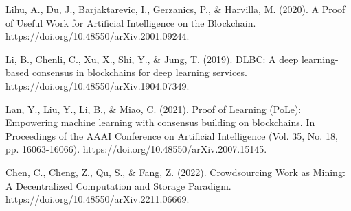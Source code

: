 \documentclass[conference]{IEEEtran}
\begin{document}
\begin{thebibliography}{00}
 Lihu, A., Du, J., Barjaktarevic, I., Gerzanics, P., \& Harvilla, M. (2020). A Proof of Useful Work for Artificial Intelligence on the Blockchain. 
https://doi.org/10.48550/arXiv.2001.09244.

 Li, B., Chenli, C., Xu, X., Shi, Y., \& Jung, T. (2019). DLBC: A deep learning-based consensus in blockchains for deep learning services. 
https://doi.org/10.48550/arXiv.1904.07349.

 Lan, Y., Liu, Y., Li, B., \& Miao, C. (2021). Proof of Learning (PoLe): Empowering machine learning with consensus building on blockchains. In Proceedings of the AAAI Conference on Artificial Intelligence (Vol. 35, No. 18, pp. 16063-16066). 
https://doi.org/10.48550/arXiv.2007.15145.

 Chen, C., Cheng, Z., Qu, S., \& Fang, Z. (2022). Crowdsourcing Work as Mining: A Decentralized Computation and Storage Paradigm. 
https://doi.org/10.48550/arXiv.2211.06669.

\end{thebibliography}
\end{document}
